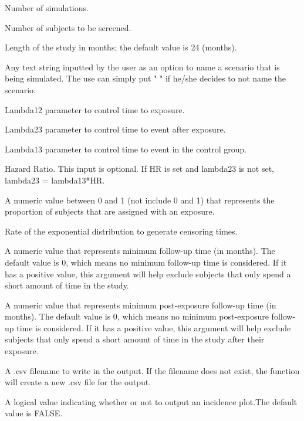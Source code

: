 \documentclass[a4paper]{book}
\begin{document}
\begin{Arguments}
\begin{ldescription}
\item[\code{nSim}] 
Number of simulations.

\item[\code{N}] 
Number of subjects to be screened.

\item[\code{duration}] 
Length of the study in months; the default value is 24 (months).

\item[\code{scenario}] 
Any text string inputted by the user as an option to name a scenario that is being simulated. The use can simply put " " if he/she decides to not name the scenario.

\item[\code{lambda12}] 
Lambda12 parameter to control time to exposure.

\item[\code{lambda23}] 
Lambda23 parameter to control time to event after exposure.

\item[\code{lambda13}] 
Lambda13 parameter to control time to event in the control group.

\item[\code{HR}] 
Hazard Ratio. This input is optional. If HR is set and lambda23 is not set, lambda23 = lambda13*HR.

\item[\code{exp.prop}] 
A numeric value between 0 and 1 (not include 0 and 1) that represents the proportion of subjects that are assigned with an exposure.

\item[\code{rateC}] 
Rate of the exponential distribution to generate censoring times.

\item[\code{min.futime}] 
A numeric value that represents minimum follow-up time (in months). The default value is 0, which means no minimum follow-up time is considered. If it has a positive value, this argument will help exclude subjects that only spend a short amount of time in the study.

\item[\code{min.postexp.futime}] 
A numeric value that represents minimum post-exposure follow-up time (in months). The default value is 0, which means no minimum post-exposure follow-up time is considered. If it has a positive value, this argument will help exclude subjects that only spend a short amount of time in the study after their exposure.

\item[\code{output.fn}] 
A .csv filename to write in the output. If the filename does not exist, the function will create a new .csv file for the output.

\item[\code{simu.plot}] 
A logical value indicating whether or not to output an incidence plot.The default value is FALSE.

\end{ldescription}
\end{Arguments}
\end{document}
